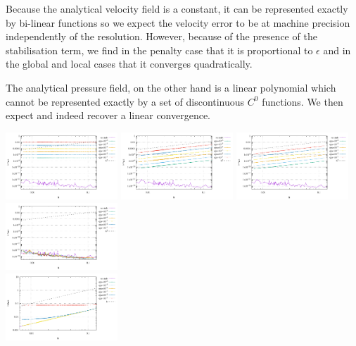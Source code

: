 Because the analytical velocity field is a constant, it can be represented exactly 
by bi-linear functions so we expect the velocity error to be at machine precision
independently of the resolution. However, because of the presence of the stabilisation
term, we find in the penalty case that it is proportional to $\epsilon$ and 
in the global and local cases that it converges quadratically.

The analytical pressure field, on the other hand is a linear polynomial which cannot 
be represented exactly by a set of discontinuous $C^0$ functions. We then expect and 
indeed recover a linear convergence.


\begin{center}
\includegraphics[width=4.21cm]{python_codes/fieldstone_115/results/aquarium/errorsV_penalty.pdf}
\includegraphics[width=4.21cm]{python_codes/fieldstone_115/results/aquarium/errorsV_global.pdf}
\includegraphics[width=4.21cm]{python_codes/fieldstone_115/results/aquarium/errorsV_local.pdf}
\includegraphics[width=4.21cm]{python_codes/fieldstone_115/results/aquarium/errorsV_macro.pdf}\\
\includegraphics[width=4.21cm]{python_codes/fieldstone_115/results/aquarium/errorsP_penalty.pdf}

\end{center}
